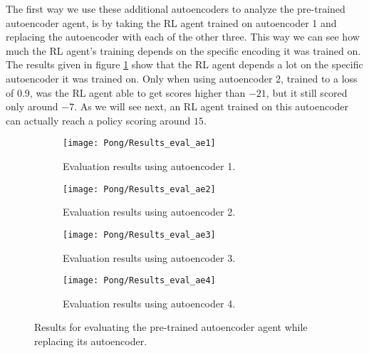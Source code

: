 The first way we use these additional autoencoders to analyze the pre-trained autoencoder agent, is by taking the RL agent trained on autoencoder 1 and replacing the autoencoder with each of the other three. This way we can see how much the RL agent's training depends on the specific encoding it was trained on. The results given in figure \ref{fig:ae-evals} show that the RL agent depends a lot on the specific autoencoder it was trained on. Only  when using autoencoder 2, trained to a loss of 0.9, was the RL agent able to get scores higher than $-21$, but it still scored only around $-7$. As we will see next, an RL agent trained on this autoencoder can actually reach a policy scoring around $15$.

\begin{figure}[h]
	\centering
	\begin{subfigure}[b]{0.40\textwidth}
		\texttt{[image: Pong/Results\_eval\_ae1]}
		\caption{Evaluation results using autoencoder 1.}
	\end{subfigure}\hfill
	\begin{subfigure}[b]{0.40\textwidth}
		\texttt{[image: Pong/Results\_eval\_ae2]}
		\caption{Evaluation results using autoencoder 2.}
		\medskip
	\end{subfigure}
	\begin{subfigure}[b]{0.4\textwidth}
		\texttt{[image: Pong/Results\_eval\_ae3]}
		\caption{Evaluation results using autoencoder 3.}
	\end{subfigure}\hfill
	\begin{subfigure}[b]{0.4\textwidth}
		\texttt{[image: Pong/Results\_eval\_ae4]}
		\caption{Evaluation results using autoencoder 4.}
	\end{subfigure}
	\caption{Results for evaluating the pre-trained autoencoder agent while replacing its autoencoder.}
	\label{fig:ae-evals}
\end{figure}

